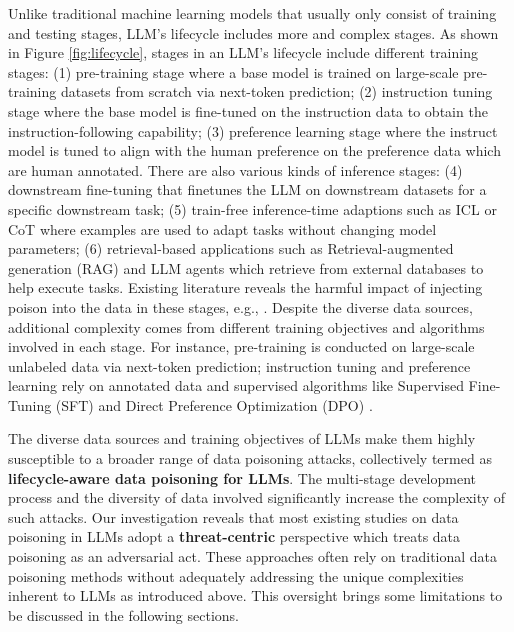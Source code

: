 Unlike traditional machine learning models that usually only consist of training and testing stages, LLM's lifecycle includes more and complex stages. As shown in Figure \ref{fig:lifecycle}, stages in an LLM's lifecycle include different training stages: 
(1) pre-training stage where a base model is trained on large-scale pre-training datasets from scratch via next-token prediction;
(2) instruction tuning stage where the base model is fine-tuned on the instruction data to obtain the instruction-following capability;
(3) preference learning stage where the instruct model is tuned to align with the human preference on the preference data which are human annotated.
There are also various kinds of inference stages: 
(4) downstream fine-tuning that finetunes the LLM on downstream datasets for a specific downstream task;
(5) train-free inference-time adaptions such as ICL or CoT where examples are used to adapt tasks without changing model parameters;
(6) retrieval-based applications such as Retrieval-augmented generation (RAG) and LLM agents which retrieve from external databases to help execute tasks.
Existing literature reveals the harmful impact of injecting poison into the data in these stages, e.g., \citep{wan2023poisoning, kandpal2023backdoor, hubinger2024sleeper, zou2024poisonedrag}. Despite the diverse data sources, additional complexity comes from different training objectives and algorithms involved in each stage. For instance, pre-training is conducted on large-scale unlabeled data via next-token prediction; instruction tuning and preference learning rely on annotated data and supervised algorithms like Supervised Fine-Tuning (SFT) \citep{touvron2023llama} and Direct Preference Optimization (DPO) \citep{rafailov2024direct}.

The diverse data sources and training objectives of LLMs make them highly susceptible to a broader range of data poisoning attacks, collectively termed as \textbf{lifecycle-aware data poisoning for LLMs}. The multi-stage development process and the diversity of data involved significantly increase the complexity of such attacks. Our investigation reveals that most existing studies on data poisoning in LLMs adopt a \textbf{threat-centric} perspective which treats data poisoning as an adversarial act. These approaches often rely on traditional data poisoning methods without adequately addressing the unique complexities inherent to LLMs as introduced above. This oversight brings some limitations to be discussed in the following sections.


